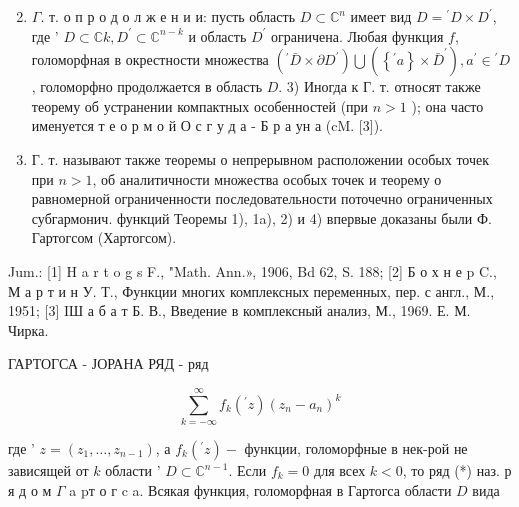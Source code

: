 \documentclass[10pt]{article}
\begin{document}
\begin{enumerate}

  \setcounter{enumi}{1}

  \item $\Gamma$. т. о п р о д о л ж е н и и: пусть область $D \subset \mathbb{C}^{n}$ имеет вид $D={ }^{\prime} D \times D^{\prime}$, где ' $D \subset \mathbb{C} k, D^{\prime} \subset \mathbb{C}^{n-k}$ и область $D^{\prime}$ ограничена. Любая функция $f$, голоморфная в окрестности множества $\left({ }^{\prime} \bar{D} \times \partial D^{\prime}\right) \bigcup\left(\left\{{ }^{\prime} a\right\} \times \bar{D}^{\prime}\right), a^{\prime} \in{ }^{\prime} D$, голоморфно продолжается в область $D$. 3) Иногда к Г. т. относят также теорему об устранении компактных особенностей (при $n>1$ ); она часто именуется т е о р м о й $О$ с г у д а - Б р а ун а (cM. [3]).



  \item Г. т. называют также теоремы о непрерывном расположении особых точек при $n>1$, об аналитичности множества особых точек и теорему о равномерной ограниченности последовательности поточечно ограниченных субгармонич. функций Теоремы 1), 1a), 2) и 4) впервые доказаны были Ф. Гартогсом (Хартогсом).



\end{enumerate}



Jum.: [1] H a r t o g s F., "Math. Ann.», 1906, Bd 62, S. 188; [2] Б о х н е p C., М а р т и н У. Т., Функции многих комплексных переменных, пер. с англ., М., 1951; [3] IШ а б а т Б. В., Введение в комплексный анализ, М., 1969. Е. М. Чирка.



ГАРТОГСА - ЈОРАНА РЯД - ряд



\[

\sum_{k=-\infty}^{\infty} f_{k}\left({ }^{\prime} z\right)\left(z_{n}-a_{n}\right)^{k}

\]



где ' $z=\left(z_{1}, \ldots, z_{n-1}\right)$, а $f_{k}\left({ }^{\prime} z\right)-$ функции, голоморфные в нек-рой не зависящей от $k$ области ' $D \subset \mathbb{C}^{n-1}$. Если $f_{k}=0$ для всех $k<0$, то ряд (*) наз. р я д о м $\Gamma$ a pт о г c a. Всякая функция, голоморфная в Гартогса области $D$ вида
\end{document}
